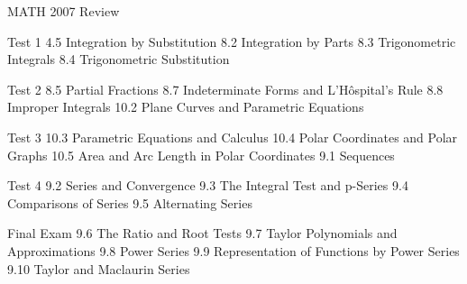 \documentclass{article}
\begin{document}
{\Huge MATH 2007 Review}

Test 1
4.5 Integration by Substitution
8.2 Integration by Parts
8.3 Trigonometric Integrals
8.4 Trigonometric Substitution

Test 2
8.5 Partial Fractions
8.7 Indeterminate Forms and L'H\^{o}spital's Rule
8.8 Improper Integrals
10.2 Plane Curves and Parametric Equations

Test 3
10.3 Parametric Equations and Calculus
10.4 Polar Coordinates and Polar Graphs
10.5 Area and Arc Length in Polar Coordinates
9.1 Sequences

Test 4
9.2 Series and Convergence
9.3 The Integral Test and p-Series
9.4 Comparisons of Series
9.5 Alternating Series

Final Exam
9.6 The Ratio and Root Tests
9.7 Taylor Polynomials and Approximations
9.8 Power Series
9.9 Representation of Functions by Power Series
9.10 Taylor and Maclaurin Series
\end{document}
